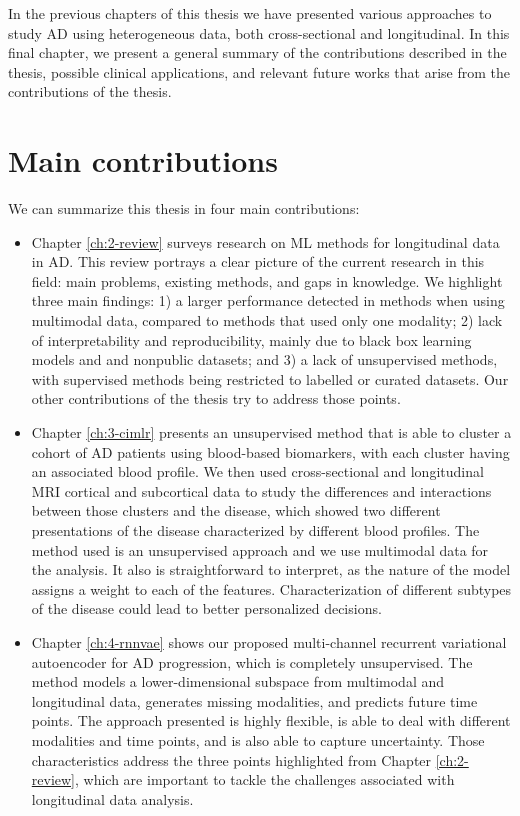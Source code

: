 In the previous chapters of this thesis we have presented various approaches to study AD using heterogeneous data, both cross-sectional and longitudinal. In this final chapter, we present a general summary of the contributions described in the thesis, possible clinical applications, and relevant future works that arise from the contributions of the thesis.

\section{Main contributions}

We can summarize this thesis in four main contributions:

\begin{itemize}
\item Chapter \ref{ch:2-review} surveys research on ML methods for longitudinal data in AD. This review portrays a clear picture of the current research in this field: main problems, existing methods, and gaps in knowledge. We highlight three main findings: 1) a larger performance detected in methods when using multimodal data, compared to methods that used only one modality; 2) lack of interpretability and reproducibility, mainly due to black box learning models and and nonpublic datasets; and 3) a lack of unsupervised methods, with supervised methods being restricted to labelled or curated datasets. Our other contributions of the thesis try to address those points.

\item Chapter \ref{ch:3-cimlr} presents an unsupervised method that is able to cluster a cohort of AD patients using blood-based biomarkers, with each cluster having an associated blood profile. We then used cross-sectional and longitudinal MRI cortical and subcortical data to study the differences and interactions between those clusters and the disease, which showed two different presentations of the disease characterized by different blood profiles. The method used is an unsupervised approach and we use multimodal data for the analysis. It also is straightforward to interpret, as the nature of the model assigns a weight to each of the features. Characterization of different subtypes of the disease could lead to better personalized decisions.

\item Chapter \ref{ch:4-rnnvae} shows our proposed multi-channel recurrent variational autoencoder for AD progression, which is completely unsupervised. The method models a lower-dimensional subspace from multimodal and longitudinal data, generates missing modalities, and predicts future time points. The approach presented is highly flexible, is able to deal with different modalities and time points, and is also able to capture uncertainty. Those characteristics address the three points highlighted from Chapter \ref{ch:2-review}, which are important to tackle the challenges associated with longitudinal data analysis.


\end{itemize}
